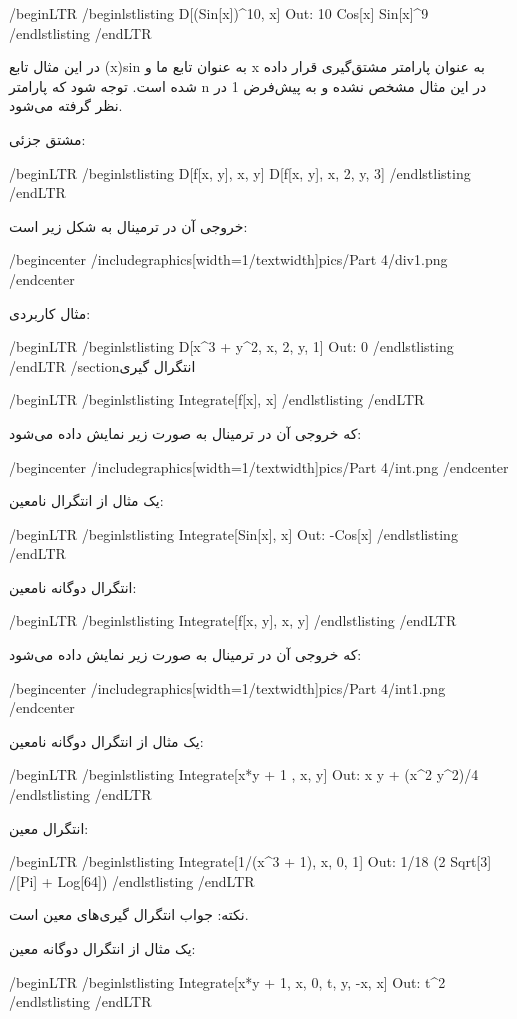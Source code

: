 /begin{LTR}
/begin{lstlisting}
D[(Sin[x])^10, x]                    Out: 10 Cos[x] Sin[x]^9
/end{lstlisting}
/end{LTR}

در این مثال تابع (x)sin به عنوان تابع ما و x به عنوان پارامتر مشتق‌گیری قرار داده شده است. توجه شود که پارامتر n در این مثال مشخص نشده و به پیش‌فرض 1 در نظر گرفته می‌شود.

مشتق جزئی:

/begin{LTR}
/begin{lstlisting}
D[f[x, y], x, y]
D[f[x, y], {x, 2}, {y, 3}]
/end{lstlisting}
/end{LTR}

خروجی آن در ترمینال به شکل زیر است:

/begin{center}
/includegraphics[width=1/textwidth]{pics/Part 4/div1.png}
/end{center}

مثال کاربردی:

/begin{LTR}
/begin{lstlisting}
D[x^3 + y^2, {x, 2}, {y, 1}]               Out: 0
/end{lstlisting}
/end{LTR}
/section{انتگرال گیری}

/begin{LTR}
/begin{lstlisting}
Integrate[f[x], x]
/end{lstlisting}
/end{LTR}

که خروجی آن در ترمینال به صورت زیر نمایش داده می‌شود:

/begin{center}
/includegraphics[width=1/textwidth]{pics/Part 4/int.png}
/end{center}

یک مثال از انتگرال نامعین:

/begin{LTR}
/begin{lstlisting}
Integrate[Sin[x], x]        Out: -Cos[x]
/end{lstlisting}
/end{LTR}

انتگرال دوگانه نامعین:

/begin{LTR}
/begin{lstlisting}
Integrate[f[x, y], x, y]
/end{lstlisting}
/end{LTR}

که خروجی آن در ترمینال به صورت زیر نمایش داده می‌شود:

/begin{center}
/includegraphics[width=1/textwidth]{pics/Part 4/int1.png}
/end{center}

یک مثال از انتگرال دوگانه نامعین:

/begin{LTR}
/begin{lstlisting}
Integrate[x*y + 1 , x, y]            Out: x y + (x^2 y^2)/4
/end{lstlisting}
/end{LTR}

انتگرال معین:

/begin{LTR}
/begin{lstlisting}
Integrate[1/(x^3 + 1), {x, 0, 1}]           Out: 1/18 (2 Sqrt[3] /[Pi] + Log[64])
/end{lstlisting}
/end{LTR}

نکته: جواب انتگرال گیری‌های معین است.

یک مثال از انتگرال دوگانه معین:

/begin{LTR}
/begin{lstlisting}
Integrate[x*y + 1, {x, 0, t}, {y, -x, x}]          Out: t^2
/end{lstlisting}
/end{LTR}

